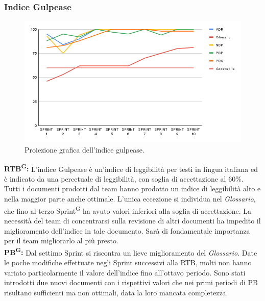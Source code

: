 \documentclass[8pt]{article}
\newcommand{\glossterm}[1]{#1\textsuperscript{G}} %
\begin{document}
\subsubsection{Indice Gulpease}
\begin{figure}[h!]
    \centering
    \includegraphics[width=1\textwidth]{images_pdq/IG.png}
    \caption{Proiezione grafica dell'indice gulpease.}
    \label{fig:Proiezione grafica dell'indice gulpease}
\end{figure}
\textbf{\glossterm{RTB}:} L'indice Gulpease è un'indice di leggibilità per testi in lingua italiana ed è indicato da una percetuale di leggibilità, con soglia di accettazione al 60\%. Tutti i documenti prodotti dal team hanno prodotto un indice di leggibilità alto e nella maggior parte anche ottimale. L'unica eccezione si individua nel \textit{Glossario}, che fino al terzo \glossterm{Sprint} ha avuto valori inferiori alla soglia di accettazione. La necessità del team di concentrarsi sulla revisione di altri documenti ha impedito il miglioramento dell'indice in tale documento. Sarà di fondamentale importanza per il team migliorarlo al più presto.\\
\textbf{\glossterm{PB}:} Dal settimo Sprint si riscontra un lieve miglioramento del \textit{Glossario}. Date le poche modifiche effettuate negli Sprint successivi alla RTB, molti non hanno variato particolarmente il valore dell'indice fino all'ottavo periodo. Sono stati introdotti due nuovi documenti con i rispettivi valori che nei primi periodi di PB risultano sufficienti ma non ottimali, data la loro mancata completezza.
\clearpage
\end{document}
